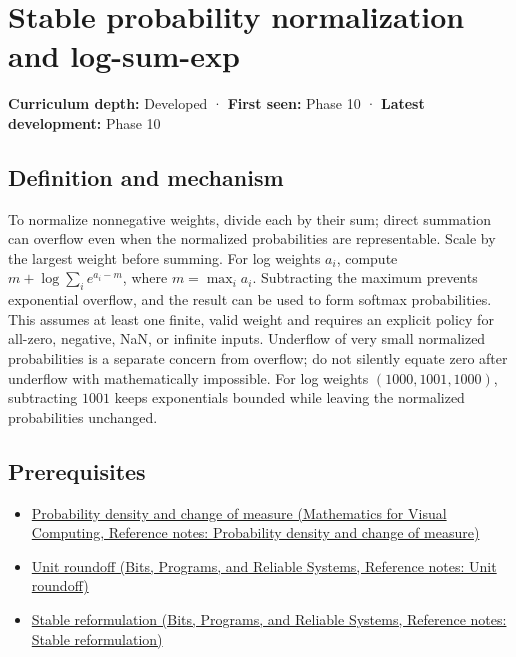 \hypertarget{appendix-d580b422240f}{}\label{referencestart:appendix-d580b422240f}
\section{Stable probability normalization and log-sum-exp}\label{appendix-d580b422240f-stable-probability-normalization-and-log-sum-exp}

\textbf{Curriculum depth:} Developed · \textbf{First seen:} Phase 10 · \textbf{Latest development:} Phase 10

\subsection{Definition and mechanism}\label{appendix-d580b422240f-definition-and-mechanism}

To normalize nonnegative weights, divide each by their sum; direct summation can overflow even when the normalized probabilities are representable. Scale by the largest weight before summing. For log weights \(a_i\), compute \(m+\log\sum_i e^{a_i-m}\), where \(m=\max_i a_i\). Subtracting the maximum prevents exponential overflow, and the result can be used to form softmax probabilities. This assumes at least one finite, valid weight and requires an explicit policy for all-zero, negative, NaN, or infinite inputs. Underflow of very small normalized probabilities is a separate concern from overflow; do not silently equate zero after underflow with mathematically impossible. For log weights \((1000,1001,1000)\), subtracting \(1001\) keeps exponentials bounded while leaving the normalized probabilities unchanged.

\subsection{Prerequisites}\label{appendix-d580b422240f-prerequisites}

\begin{itemize}
\tightlist
\item
  \href{../02-Mathematics-for-Visual-Computing/main.pdf\#nameddest=appendix-4815cd87ab8b}{Probability density and change of measure (Mathematics for Visual Computing, Reference notes: Probability density and change of measure)}
\item
  \href{../01-Bits-Programs-and-Reliable-Systems/main.pdf\#nameddest=appendix-bc44f7b42f42}{Unit roundoff (Bits, Programs, and Reliable Systems, Reference notes: Unit roundoff)}
\item
  \href{../01-Bits-Programs-and-Reliable-Systems/main.pdf\#nameddest=appendix-d7f8ba961670}{Stable reformulation (Bits, Programs, and Reliable Systems, Reference notes: Stable reformulation)}
\end{itemize}

